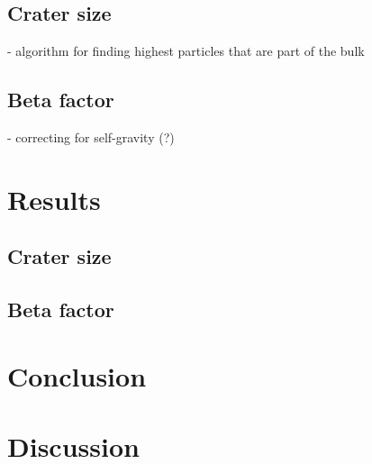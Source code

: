 \documentclass{article}
\begin{document}
		\subsection{Crater size}
		- algorithm for finding highest particles that are part of the bulk
		\subsection{Beta factor}
		- correcting for self-gravity (?)
	\section{Results}
		\subsection{Crater size}
		\subsection{Beta factor}
	\section{Conclusion}
	\section{Discussion}
	
	\newpage 
	\printbibliography
 
\end{document}
